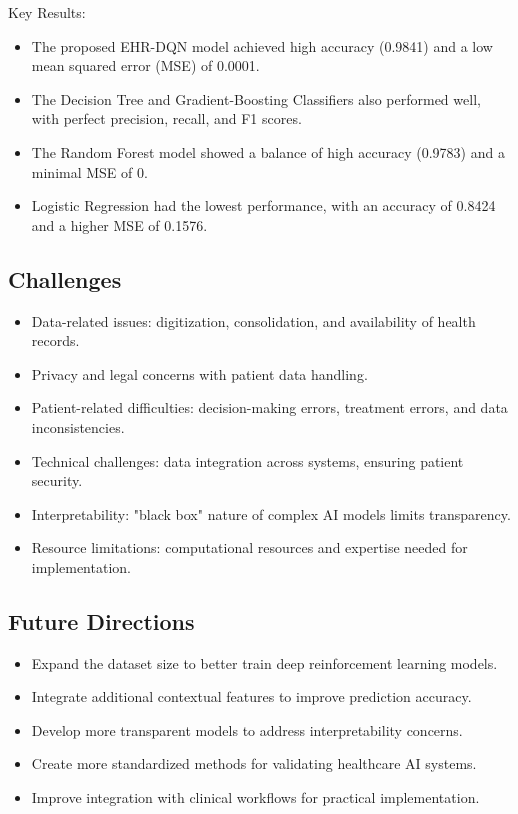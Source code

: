 Key Results:
\begin{itemize}
    \item The proposed EHR-DQN model achieved high accuracy (0.9841) and a low mean squared error (MSE) of 0.0001.
    \item The Decision Tree and Gradient-Boosting Classifiers also performed well, with perfect precision, recall, and F1 scores.
    \item The Random Forest model showed a balance of high accuracy (0.9783) and a minimal MSE of 0.
    \item Logistic Regression had the lowest performance, with an accuracy of 0.8424 and a higher MSE of 0.1576.
\end{itemize}

\subsection*{Challenges}
\begin{itemize}
    \item Data-related issues: digitization, consolidation, and availability of health records.
    \item Privacy and legal concerns with patient data handling.
    \item Patient-related difficulties: decision-making errors, treatment errors, and data inconsistencies.
    \item Technical challenges: data integration across systems, ensuring patient security.
    \item Interpretability: "black box" nature of complex AI models limits transparency.
    \item Resource limitations: computational resources and expertise needed for implementation.
\end{itemize}

\subsection*{Future Directions}
\begin{itemize}
    \item Expand the dataset size to better train deep reinforcement learning models.
    \item Integrate additional contextual features to improve prediction accuracy.
    \item Develop more transparent models to address interpretability concerns.
    \item Create more standardized methods for validating healthcare AI systems.
    \item Improve integration with clinical workflows for practical implementation.
\end{itemize}

